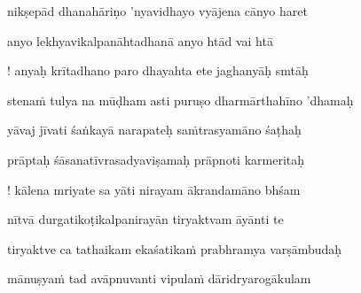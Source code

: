 \nemslokab 
nikṣepād dhanahāriṇo 'nyavidhayo vyājena cānyo haret \danda\dontdisplaylinenum

\nemslokac 
anyo lekhyavikalpanāhtadhanā anyo htād vai htā
\dontdisplaylinenum

\nemslokad 
! anyaḥ krītadhano paro dhayahta ete jaghanyāḥ smtāḥ \veg\dontdisplaylinenum

\ujvers\nemsloka 
stena\.m tulya na mūḍham asti puruṣo dharmārthahīno 'dhamaḥ
\dontdisplaylinenum

\nemslokab 
yāvaj jīvati śaṅkayā narapateḥ sa\.mtrasyamāno śaṭhaḥ \danda\dontdisplaylinenum

\nemslokac 
prāptaḥ śāsanatīvrasadyaviṣamaḥ prāpnoti karmeritaḥ
\dontdisplaylinenum

\nemslokad 
! kālena mriyate sa yāti nirayam ākrandamāno bhśam \veg\dontdisplaylinenum

\ujvers\nemsloka 
nītvā durgatikoṭikalpanirayān tiryaktvam āyānti te
\dontdisplaylinenum

\nemslokab 
tiryaktve ca tathaikam ekaśatika\.m prabhramya varṣāmbudaḥ \danda\dontdisplaylinenum

\nemslokac 
mānuṣya\.m tad avāpnuvanti vipula\.m dāridryarogākulam
\dontdisplaylinenum

